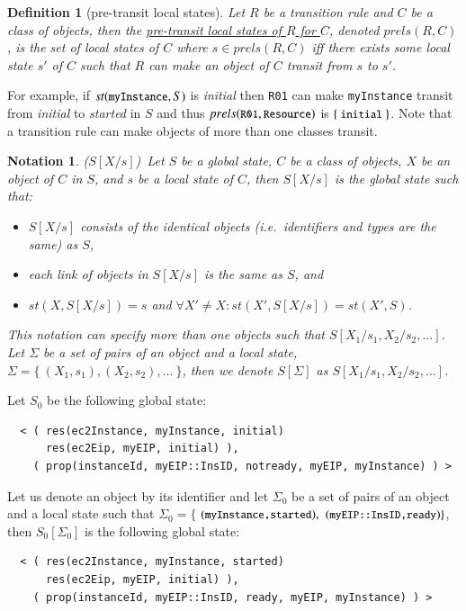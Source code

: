 \documentclass[12pt]{report}
\newtheorem{notation}{Notation}
\newtheorem{definition}{Definition}
\newcommand{\mbstt}[1]{\mbox{\small{\tt {#1}}}}
\newcommand{\stt}[1]{{\small{\tt {#1}}}}
\newcommand{\ul}{\underline}
\begin{document}
\begin{definition}[pre-transit local states]
Let $R$ be a transition rule and $C$ be a class of objects, then
the \ul{pre-transit local states of $R$ for $C$}, denoted
\ul{$prels(R,C)$}, is the set of local states of $C$ where $s \in
prels(R,C)$ iff there exists some local state $s'$ of $C$ such that
$R$ can make an object of $C$ transit from $s$ to $s'$.
\end{definition}
For example, if $st(\mbstt{myInstance},S)$ is {\it initial} then
\stt{R01} can make \stt{myInstance} transit from {\it initial} to {\it
  started} in $S$ and thus $prels(\mbstt{R01},\mbstt{Resource})$ is
$\{~\mbstt{initial}~\}$. Note that a transition rule can make objects
of more than one classes transit.

\begin{notation}($S[X/s]$)\
Let $S$ be a global state, $C$ be a class of objects, $X$ be an object
of $C$ in $S$, and $s$ be a local state of $C$, then
\ul{$S[X/s]$} is the global state such that:
\begin{itemize}
\item $S[X/s]$ consists of the identical objects (i.e.\ identifiers and
  types are the same) as $S$,
\item each link of objects in $S[X/s]$ is the same as $S$, and
\item $st(X,S[X/s])=s$ and $\forall X'\ne X:st(X',S[X/s])=st(X',S)$.
\end{itemize}
This notation can specify more than one objects such that
\ul{$S[X_1/s_1,X_2/s_2,\dots]$}.  Let $\Sigma$ be a set of pairs of
an object and a local state, $\Sigma = \{~ (X_1,s_1), (X_2,s_2), \dots~\}$,
then we denote \ul{$S[\Sigma]$} as $S[X_1/s_1,X_2/s_2,\dots]$.
\end{notation}
Let $S\!_0$ be the following global state:
\small
\begin{verbatim}
  < ( res(ec2Instance, myInstance, initial)
      res(ec2Eip, myEIP, initial) ),
    ( prop(instanceId, myEIP::InsID, notready, myEIP, myInstance) ) >
\end{verbatim}
\normalsize
Let us denote an object by its identifier and let $\Sigma_0$ be a set
of pairs of an object and a local state such that $\Sigma_0=\{$
$(\mbstt{myInstance,started}),$ $(\mbstt{myEIP::InsID,ready})\}$, then
$S\!_0[\Sigma_0]$ is the following global state:
\small
\begin{verbatim}
  < ( res(ec2Instance, myInstance, started)
      res(ec2Eip, myEIP, initial) ),
    ( prop(instanceId, myEIP::InsID, ready, myEIP, myInstance) ) >
\end{verbatim}
\normalsize
\end{document}

